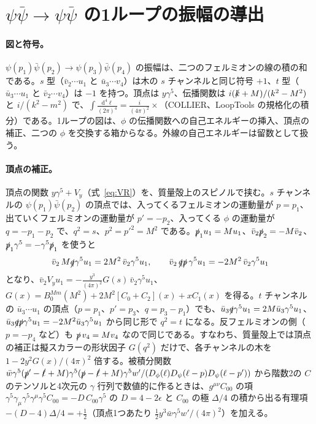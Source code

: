 \documentclass[a4paper,10pt]{ltjsarticle}
\newcommand{\dd}{\mathrm{d}}
\begin{document}
\section{$\psi\bar\psi\to\psi\bar\psi$ の1ループの振幅の導出}\label{app:scatC}

\paragraph{図と符号。}$\psi(p_1)\bar\psi(p_2)\to\psi(p_3)\bar\psi(p_4)$ の振幅は、二つのフェルミオンの線の積の和である。$s$ 型（$\bar v_2\cdots u_1$ と $\bar u_3\cdots v_4$）は木の $s$ チャンネルと同じ符号 $+1$、$t$ 型（$\bar u_3\cdots u_1$ と $\bar v_2\cdots v_4$）は $-1$ を持つ。頂点は $y\gamma^5$、伝播関数は $i(\slashed k+M)/(k^2-M^2)$ と $i/(k^2-m^2)$ で、$\int\frac{\dd^4\ell}{(2\pi)^4}=\frac{i}{(4\pi)^2}\times$（COLLIER、LoopTools の規格化の積分）である。1ループの図は、$\phi$ の伝播関数への自己エネルギーの挿入、頂点の補正、二つの $\phi$ を交換する箱からなる。外線の自己エネルギーは留数として扱う。

\paragraph{頂点の補正。}頂点の関数 $y\gamma^5+V_y$（式~\eqref{eq:VR}）を、質量殻上のスピノルで挟む。$s$ チャンネルの $\psi(p_1)\bar\psi(p_2)$ の頂点では、入ってくるフェルミオンの運動量が $p=p_1$、出ていくフェルミオンの運動量が $p'=-p_2$、入ってくる $\phi$ の運動量が $q=-p_1-p_2$ で、$q^2=s$、$p^2=p'^2=M^2$ である。$\slashed p_1u_1=Mu_1$、$\bar v_2\slashed p_2=-M\bar v_2$、$\slashed p_1\gamma^5=-\gamma^5\slashed p_1$ を使うと
\begin{equation*}
\bar v_2\,M\slashed q\gamma^5u_1=2M^2\,\bar v_2\gamma^5u_1,\qquad
\bar v_2\,\slashed q\slashed p\,\gamma^5u_1=-2M^2\,\bar v_2\gamma^5u_1
\end{equation*}
となり、$\bar v_2V_yu_1=-\frac{y^3}{(4\pi)^2}G(s)\,\bar v_2\gamma^5u_1$、$G(x)=B_0^{Mm}(M^2)+2M^2[C_0+C_2](x)+xC_1(x)$ を得る。$t$ チャンネルの $\bar u_3\cdots u_1$ の頂点（$p=p_1$、$p'=p_3$、$q=p_3-p_1$）でも、$\bar u_3\slashed q\gamma^5u_1=2M\bar u_3\gamma^5u_1$、$\bar u_3\slashed q\slashed p\gamma^5u_1=-2M^2\bar u_3\gamma^5u_1$ から同じ形で $q^2=t$ になる。反フェルミオンの側（$p=-p_4$ など）も $\slashed p\,v_4=Mv_4$ なので同じである。すなわち、質量殻上では頂点の補正は擬スカラーの形状因子 $G(q^2)$ だけで、各チャンネルの木を $1-2y^2G(x)/(4\pi)^2$ 倍する。被積分関数 $\bar w\gamma^5(\slashed p'-\slashed\ell+M)\gamma^5(\slashed p-\slashed\ell+M)\gamma^5w'/(D_\phi(\ell)D_\psi(\ell-p)D_\psi(\ell-p'))$ から階数2の $C$ のテンソルと4次元の $\gamma$ 行列で数値的に作るときは、$g^{\mu\nu}C_{00}$ の項 $\gamma^5\gamma_\mu\gamma^5\gamma^\mu\gamma^5C_{00}=-D\,C_{00}\gamma^5$ の $D=4-2\epsilon$ と $C_{00}$ の極 $\Delta/4$ の積から出る有理項 $-(D-4)\Delta/4=+\frac12$（頂点1つあたり $\frac12y^3\bar w\gamma^5w'/(4\pi)^2$）を加える。
\end{document}
